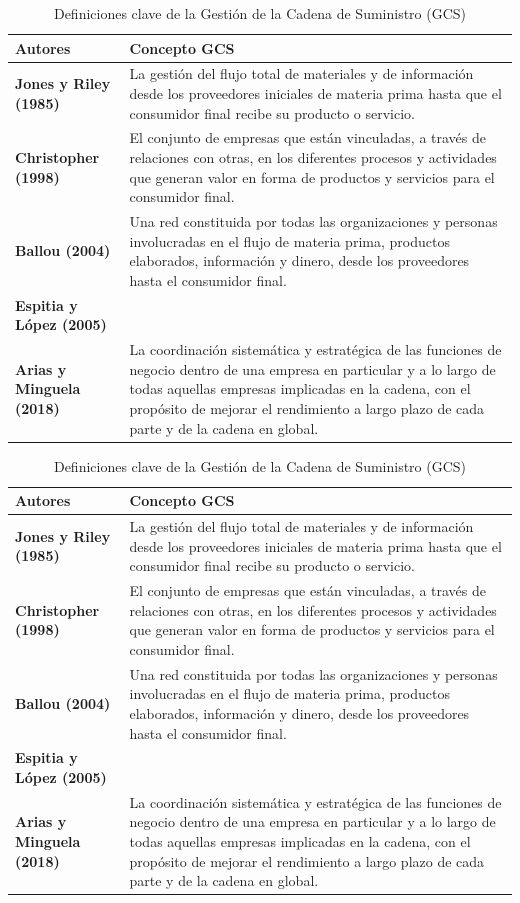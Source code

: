 \documentclass[12pt]{report} %
\begin{document}
\begin{table}[H]
\centering
\caption{Definiciones clave de la Gestión de la Cadena de Suministro (GCS)}
\begin{tabular}{|l|p{12cm}|}
\hline
\textbf{Autores} & \textbf{Concepto GCS} \\ \hline
\textbf{Jones y Riley (1985)} & La gestión del flujo total de materiales y de información desde los proveedores iniciales de materia prima hasta que el consumidor final recibe su producto o servicio. \\ \hline
\textbf{Christopher (1998)} & El conjunto de empresas que están vinculadas, a través de relaciones con otras, en los diferentes procesos y actividades que generan valor en forma de productos y servicios para el consumidor final. \\ \hline
\textbf{Ballou (2004)} & Una red constituida por todas las organizaciones y personas involucradas en el flujo de materia prima, productos elaborados, información y dinero, desde los proveedores hasta el consumidor final. \\ \hline
\textbf{Espitia y López (2005)} \\ \textbf{Arias y Minguela (2018)} & La coordinación sistemática y estratégica de las funciones de negocio dentro de una empresa en particular y a lo largo de todas aquellas empresas implicadas en la cadena, con el propósito de mejorar el rendimiento a largo plazo de cada parte y de la cadena en global. \\ \hline
\end{tabular}
\end{table}

\begin{table}[H]
\centering
\caption{Definiciones clave de la Gestión de la Cadena de Suministro (GCS)}
\begin{tabular}{|l|p{12cm}|}
\hline
\textbf{Autores} & \textbf{Concepto GCS} \\ \hline
\textbf{Jones y Riley (1985)} & La gestión del flujo total de materiales y de información desde los proveedores iniciales de materia prima hasta que el consumidor final recibe su producto o servicio. \\ \hline
\textbf{Christopher (1998)} & El conjunto de empresas que están vinculadas, a través de relaciones con otras, en los diferentes procesos y actividades que generan valor en forma de productos y servicios para el consumidor final. \\ \hline
\textbf{Ballou (2004)} & Una red constituida por todas las organizaciones y personas involucradas en el flujo de materia prima, productos elaborados, información y dinero, desde los proveedores hasta el consumidor final. \\ \hline
\textbf{Espitia y López (2005)} \\ \textbf{Arias y Minguela (2018)} & La coordinación sistemática y estratégica de las funciones de negocio dentro de una empresa en particular y a lo largo de todas aquellas empresas implicadas en la cadena, con el propósito de mejorar el rendimiento a largo plazo de cada parte y de la cadena en global. \\ \hline
\end{tabular}
\end{table}
\end{document}

